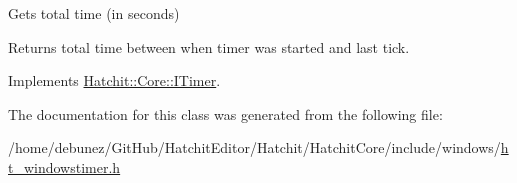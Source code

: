 Gets total time (in seconds) 

Returns total time between when timer was started and last tick. 

Implements \hyperlink{classHatchit_1_1Core_1_1ITimer_af5d9551ef9a0a98591f823b014efca11}{Hatchit\+::\+Core\+::\+I\+Timer}.



The documentation for this class was generated from the following file\+:\begin{DoxyCompactItemize}
\item 
/home/debunez/\+Git\+Hub/\+Hatchit\+Editor/\+Hatchit/\+Hatchit\+Core/include/windows/\hyperlink{ht__windowstimer_8h}{ht\+\_\+windowstimer.\+h}\end{DoxyCompactItemize}
